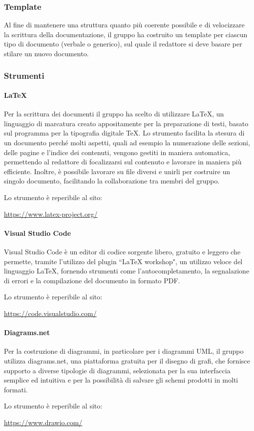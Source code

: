\subsubsection{Template}
Al fine di mantenere una struttura quanto più coerente possibile e di velocizzare la scrittura della documentazione, il gruppo ha costruito un template per ciascun tipo di documento (verbale o generico), sul quale il redattore si deve basare per stilare un nuovo documento. 
\subsubsection{Strumenti}
\paragraph{\LaTeX}
Per la scrittura dei documenti il gruppo ha scelto di utilizzare \LaTeX, un linguaggio di marcatura creato appositamente per la preparazione di testi, basato sul programma per la tipografia digitale \TeX. Lo strumento facilita la stesura di un documento perché molti aspetti, quali ad esempio la numerazione delle sezioni, delle pagine e l'indice dei contenuti, vengono gestiti in maniera automatica, permettendo al redattore di focalizzarsi sul contenuto e lavorare in maniera più efficiente. Inoltre, è possibile lavorare su file diversi e unirli per costruire un singolo documento, facilitando la collaborazione tra membri del gruppo.
\par Lo strumento è reperibile al sito:
\begin{center}
    \url{https://www.latex-project.org/}
\end{center}
\paragraph{Visual Studio Code}
Visual Studio Code è un editor di codice sorgente libero, gratuito e leggero che permette, tramite l'utilizzo del plugin ``LaTeX workshop", un utilizzo veloce del linguaggio \LaTeX, fornendo strumenti come l'autocompletamento, la segnalazione di errori e la compilazione del documento in formato PDF.
\par Lo strumento è reperibile al sito:
\begin{center}
    \url{https://code.visualstudio.com/}
\end{center}
\paragraph{Diagrams.net}
Per la costruzione di diagrammi, in particolare per i diagrammi UML, il gruppo utilizza diagrams.net, una piattaforma gratuita per il disegno di grafi, che fornisce supporto a diverse tipologie di diagrammi, selezionata per la sua interfaccia semplice ed intuitiva e per la possibilità di salvare gli schemi prodotti in molti formati.
\par Lo strumento è reperibile al sito:
\begin{center}
    \url{https://www.drawio.com/}
\end{center}

